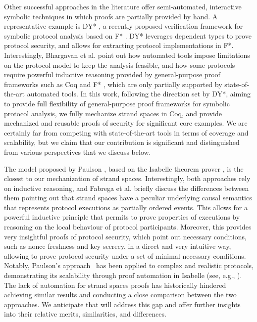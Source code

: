 Other successful approaches in the literature offer semi-automated, interactive symbolic techniques in which proofs are partially provided by hand. A representative example is DY* \cite{DY}, a recently proposed verification framework for symbolic protocol analysis based on F* \cite{Fstar}. DY* leverages dependent types to prove protocol security, and allows for extracting protocol implementations in F*. Interestingly, Bhargavan et al. \cite{DY} point out how automated tools impose limitations on the protocol model to keep the analysis feasible, and how some protocols require powerful inductive reasoning provided by general-purpose proof frameworks such as Coq \cite{coq} and F* \cite{Fstar}, which are only partially supported by state-of-the-art automated tools. In this work, following the direction set by DY*, aiming to provide full flexibility of general-purpose proof frameworks for symbolic protocol analysis,  we fully mechanize strand spaces in Coq, and provide mechanized and reusable proofs of security for significant core examples. We are certainly far from competing with state-of-the-art tools in terms of coverage and scalability, but we claim that our contribution is significant and distinguished from various perspectives that we discuss below.


The model proposed by Paulson \cite{Paulson98}, based on the Isabelle theorem prover \cite{Paulson94}, is the closest to our mechanization of strand spaces. Interestingly, both approaches rely on inductive reasoning, and Fabrega et al. \cite{FHG98} briefly discuss the differences between them pointing out that strand spaces have a peculiar underlying causal semantics that represents protocol executions as partially ordered events. This allows for a powerful inductive principle that permits to prove properties of executions by reasoning on the local behaviour of protocol participants. Moreover, this provides very insightful proofs of protocol security, which point out necessary conditions, such as nonce freshness and key secrecy, in a direct and very intuitive way, allowing to prove protocol security under a set of minimal necessary conditions.
Notably, Paulson's approach~\cite{Paulson98}  has been applied to complex and realistic protocols, demonstrating its scalability through proof automation in Isabelle (see, e.g., \cite{BellaP98}). The lack of automation for strand spaces proofs has historically hindered achieving similar results and conducting a close comparison between the two approaches. We anticipate that \easystrands{} will address this gap and offer further insights into their relative merits, similarities, and differences.

